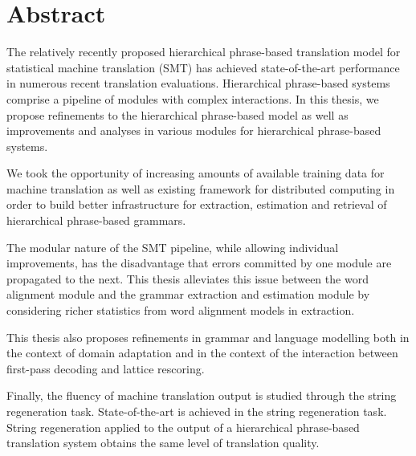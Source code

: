 \chapter*{Abstract}

The relatively recently proposed hierarchical phrase-based
translation model for statistical machine translation (SMT)
has achieved state-of-the-art performance
in numerous recent translation evaluations. Hierarchical phrase-based
systems comprise a pipeline of modules with complex interactions.
In this thesis, we propose refinements to the hierarchical
phrase-based model as well as improvements and analyses in various
modules for hierarchical phrase-based systems.

We took the opportunity of increasing amounts of available training
data for machine translation as well as existing framework for
distributed computing in order to build better infrastructure
for extraction, estimation and retrieval of hierarchical phrase-based
grammars.

The modular nature of the SMT pipeline, while allowing individual
improvements, has the disadvantage that errors committed by
one module are propagated to the next. This thesis
alleviates this issue between the word alignment module and the
grammar extraction and estimation module by considering richer
statistics from word alignment models in extraction.

This thesis also proposes refinements in grammar and language
modelling both in the context of domain adaptation and in the
context of the interaction between first-pass decoding and
lattice rescoring.

Finally, the fluency of machine translation output is studied
through the string regeneration task. State-of-the-art is achieved
in the string regeneration task. String regeneration applied
to the output of a hierarchical phrase-based translation system
obtains the same level of translation quality.
